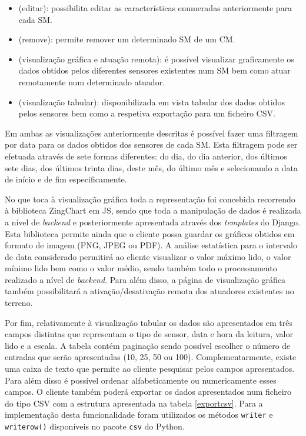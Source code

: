 \begin{itemize}
	\item \faEdit \space (editar): possibilita editar as características enumeradas anteriormente para cada \acl{SM}. 
	\item \faTrash \space (remove): permite remover um determinado \acl{SM} de um \acl{CM}. 
	\item \faBarChart \faCogs \space (visualização gráfica e atuação remota): é possível visualizar graficamente os dados obtidos pelos diferentes sensores existentes num \acl{SM} bem como atuar remotamente num determinado atuador. 
	\item \faDatabase \space (visualização tabular): disponibilizada em vista tabular dos dados obtidos pelos sensores bem como a respetiva exportação para um ficheiro \ac{CSV}. 
\end{itemize}


Em ambas as visualizações anteriormente descritas é possível fazer uma filtragem por data para os dados obtidos dos sensores de cada \acl{SM}. Esta filtragem pode ser efetuada através de sete formas diferentes: do dia, do dia anterior, dos últimos sete dias, dos últimos trinta dias, deste mês, do último mês e selecionando a data de início e de fim especificamente. 


No que toca à visualização gráfica toda a representação foi concebida recorrendo à biblioteca ZingChart em \ac{JS}, sendo que toda a manipulação de dados é realizada a nível de \textit{backend} e posteriormente apresentada através dos \textit{templates} do Django. Esta biblioteca permite ainda que o cliente possa guardar os gráficos obtidos em formato de imagem (PNG, JPEG ou PDF).  A análise estatística para o intervalo de data considerado permitirá ao cliente visualizar o valor máximo lido, o valor mínimo lido bem como o valor médio, sendo também todo o processamento realizado a nível de \textit{backend}. Para além disso, a página de visualização gráfica também possibilitará a ativação/desativação remota dos atuadores existentes no terreno. 


Por fim, relativamente à visualização tabular os dados são apresentados em três campos distintas que representam o tipo de sensor, data e hora da leitura, valor lido e a escala. A tabela contém paginação sendo possível escolher o número de entradas que serão apresentadas (10, 25, 50 ou 100). Complementarmente, existe uma caixa de texto que permite ao cliente pesquisar pelos campos apresentados. Para além disso é possível ordenar alfabeticamente ou numericamente esses campos. O cliente também poderá exportar os dados apresentados num ficheiro do tipo \ac{CSV} com a estrutura apresentada na tabela \ref{exportcsv}. Para a implementação desta funcionalidade foram utilizados os métodos \texttt{writer} e \texttt{writerow()} disponíveis no pacote \texttt{csv} do Python.  



